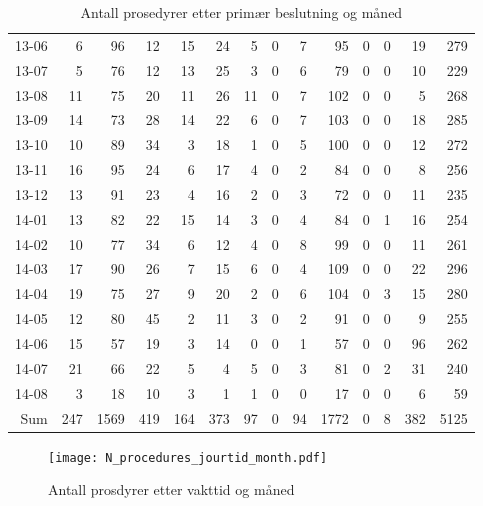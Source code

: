 \documentclass[presentation,xcolor=pdftex,dvipsnames,table]{beamer}
\begin{document}
\begin{frame}
\begin{tiny}
\begin{table}[ht]
\begin{tabular}{rrrrrrrrrrrrrr}
  13-06 & 6 & 96 & 12 & 15 & 24 & 5 & 0 & 7 & 95 & 0 & 0 & 19 & 279 \\ 
  13-07 & 5 & 76 & 12 & 13 & 25 & 3 & 0 & 6 & 79 & 0 & 0 & 10 & 229 \\ 
  13-08 & 11 & 75 & 20 & 11 & 26 & 11 & 0 & 7 & 102 & 0 & 0 & 5 & 268 \\ 
  13-09 & 14 & 73 & 28 & 14 & 22 & 6 & 0 & 7 & 103 & 0 & 0 & 18 & 285 \\ 
  13-10 & 10 & 89 & 34 & 3 & 18 & 1 & 0 & 5 & 100 & 0 & 0 & 12 & 272 \\ 
  13-11 & 16 & 95 & 24 & 6 & 17 & 4 & 0 & 2 & 84 & 0 & 0 & 8 & 256 \\ 
  13-12 & 13 & 91 & 23 & 4 & 16 & 2 & 0 & 3 & 72 & 0 & 0 & 11 & 235 \\ 
  14-01 & 13 & 82 & 22 & 15 & 14 & 3 & 0 & 4 & 84 & 0 & 1 & 16 & 254 \\ 
  14-02 & 10 & 77 & 34 & 6 & 12 & 4 & 0 & 8 & 99 & 0 & 0 & 11 & 261 \\ 
  14-03 & 17 & 90 & 26 & 7 & 15 & 6 & 0 & 4 & 109 & 0 & 0 & 22 & 296 \\ 
  14-04 & 19 & 75 & 27 & 9 & 20 & 2 & 0 & 6 & 104 & 0 & 3 & 15 & 280 \\ 
  14-05 & 12 & 80 & 45 & 2 & 11 & 3 & 0 & 2 & 91 & 0 & 0 & 9 & 255 \\ 
  14-06 & 15 & 57 & 19 & 3 & 14 & 0 & 0 & 1 & 57 & 0 & 0 & 96 & 262 \\ 
  14-07 & 21 & 66 & 22 & 5 & 4 & 5 & 0 & 3 & 81 & 0 & 2 & 31 & 240 \\ 
  14-08 & 3 & 18 & 10 & 3 & 1 & 1 & 0 & 0 & 17 & 0 & 0 & 6 & 59 \\ 
  Sum & 247 & 1569 & 419 & 164 & 373 & 97 & 0 & 94 & 1772 & 0 & 8 & 382 & 5125 \\ 
   \bottomrule
\end{tabular}
\caption{Antall prosedyrer etter primær beslutning og måned} 
\end{table}\end{tiny}
\end{frame}




\begin{frame}
\begin{figure}
  \centering
  \caption{Antall prosdyrer etter vakttid og måned}
\texttt{[image: N\_procedures\_jourtid\_month.pdf]}
\end{figure}\end{frame}
\end{document}
